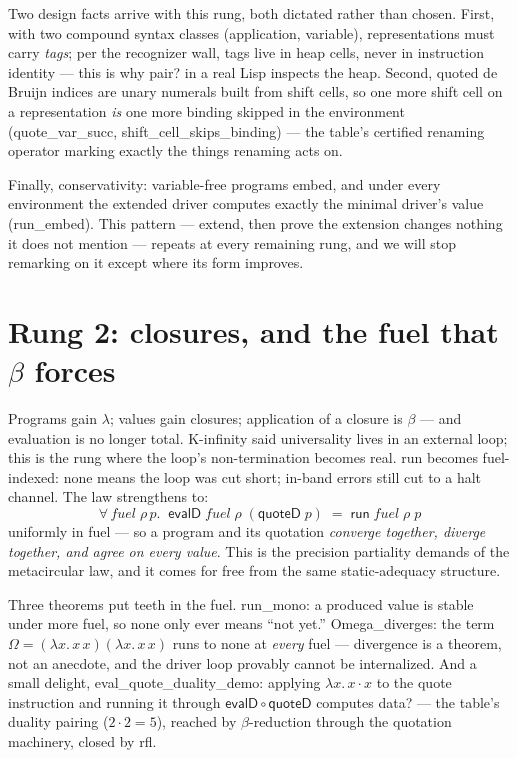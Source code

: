 \documentclass[acmsmall,screen,review]{acmart}
\begin{document}
Two design facts arrive with this rung, both dictated rather than
chosen. First, with two compound syntax classes (application,
variable), representations must carry \emph{tags}; per the recognizer
wall, tags live in heap cells, never in instruction identity --- this
is why \textsf{pair?} in a real Lisp inspects the heap. Second,
quoted de Bruijn indices are unary numerals built from
\textsf{shift} cells, so one more shift cell on a representation
\emph{is} one more binding skipped in the environment
(\textsf{quote\_var\_succ}, \textsf{shift\_cell\_skips\_binding}) ---
the table's certified renaming operator marking exactly the things
renaming acts on.

Finally, conservativity: variable-free programs embed, and under
every environment the extended driver computes exactly the minimal
driver's value (\textsf{run\_embed}). This pattern --- extend, then
prove the extension changes nothing it does not mention --- repeats
at every remaining rung, and we will stop remarking on it except
where its form improves.

\section{Rung 2: closures, and the fuel that \texorpdfstring{$\beta$}{beta} forces}
\label{sec:clos}

Programs gain $\lambda$; values gain closures; application of a
closure is $\beta$ --- and evaluation is no longer total.
K-infinity said universality lives in an external loop; this is the
rung where the loop's non-termination becomes real. \textsf{run}
becomes fuel-indexed: \textsf{none} means the loop was cut short;
in-band errors still cut to a halt channel. The law strengthens to:
\[
  \forall\, \mathit{fuel}\;\rho\, p.\;\;
  \mathsf{evalD}\;\mathit{fuel}\;\rho\;(\mathsf{quoteD}\;p)
  \;=\; \mathsf{run}\;\mathit{fuel}\;\rho\;p
\]
uniformly in fuel --- so a program and its quotation \emph{converge
together, diverge together, and agree on every value}. This is the
precision partiality demands of the metacircular law, and it comes
for free from the same static-adequacy structure.

Three theorems put teeth in the fuel. \textsf{run\_mono}: a produced
value is stable under more fuel, so \textsf{none} only ever means
``not yet.'' \textsf{Omega\_diverges}: the term
$\Omega = (\lambda x.\,x\,x)(\lambda x.\,x\,x)$ runs to \textsf{none}
at \emph{every} fuel --- divergence is a theorem, not an anecdote,
and the driver loop provably cannot be internalized. And a small
delight, \textsf{eval\_quote\_duality\_demo}: applying
$\lambda x.\,x \cdot x$ to the quote instruction and running it
through $\mathsf{evalD} \circ \mathsf{quoteD}$ computes
\textsf{data?} --- the table's duality pairing
($2 \cdot 2 = 5$), reached by $\beta$-reduction through the
quotation machinery, closed by \textsf{rfl}.
\end{document}
